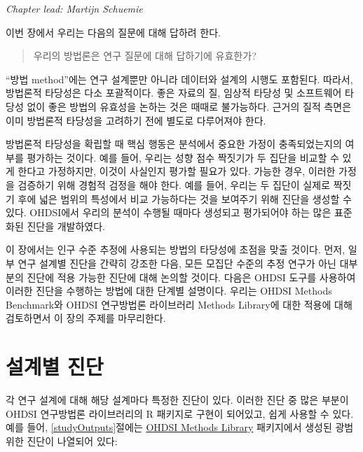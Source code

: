 \documentclass[10.5pt]{book}
\theoremstyle{definition}
\theoremstyle{definition}
\theoremstyle{definition}
\theoremstyle{remark}
\begin{document}

\emph{Chapter lead: Martijn Schuemie}

이번 장에서 우리는 다음의 질문에 대해 답하려 한다.

\begin{quote}
우리의 방법론은 연구 질문에 대해 답하기에 유효한가?
\end{quote}

``방법 method''에는 연구 설계뿐만 아니라 데이터와 설계의 시행도
포함된다. 따라서, 방법론적 타당성은 다소 포괄적이다. 좋은 자료의 질,
임상적 타당성 및 소프트웨어 타당성 없이 좋은 방법의 유효성을 논하는 것은
때때로 불가능하다. 근거의 질적 측면은 이미 방법론적 타당성을 고려하기
전에 별도로 다루어져야 한다.

방법론적 타당성을 확립할 때 핵심 행동은 분석에서 중요한 가정이
충족되었는지의 여부를 평가하는 것이다. 예를 들어, 우리는 성향 점수
짝짓기가 두 집단을 비교할 수 있게 한다고 가정하지만, 이것이 사실인지
평가할 필요가 있다. 가능한 경우, 이러한 가정을 검증하기 위해 경험적
검정을 해야 한다. 예를 들어, 우리는 두 집단이 실제로 짝짓기 후에 넓은
범위의 특성에서 비교 가능하다는 것을 보여주기 위해 진단을 생성할 수
있다. OHDSI에서 우리의 분석이 수행될 때마다 생성되고 평가되어야 하는
많은 표준화된 진단을 개발하였다.

이 장에서는 인구 수준 추정에 사용되는 방법의 타당성에 초점을 맞출
것이다. 먼저, 일부 연구 설계별 진단을 간략히 강조한 다음, 모든 모집단
수준의 추정 연구가 아닌 대부분의 진단에 적용 가능한 진단에 대해 논의할
것이다. 다음은 OHDSI 도구를 사용하여 이러한 진단을 수행하는 방법에 대한
단계별 설명이다. 우리는 OHDSI Methods Benchmark와 OHDSI 연구방법론
라이브러리 Methods Library에 대한 적용에 대해 검토하면서 이 장의 주제를
마무리한다.

\section{설계별 진단}\label{-}


각 연구 설계에 대해 해당 설계마다 특정한 진단이 있다. 이러한 진단 중
많은 부분이 OHDSI 연구방법론 라이브러리의 R 패키지로 구현이 되어있고,
쉽게 사용할 수 있다. 예를 들어, \ref{studyOutputs}절에는
\href{https://ohdsi.github.io/MethodsLibrary/}{OHDSI Methods Library}
패키지에서 생성된 광범위한 진단이 나열되어 있다:
\end{document}
